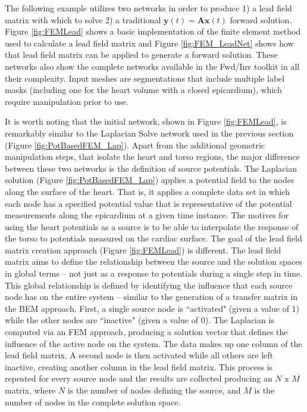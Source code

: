 The following example utilizes two networks in order to produce 1) a lead field matrix with which to solve 
2) a traditional $\mathbf{y}(t) = \mathbf{A}\mathbf{x}(t)$ forward solution. 
Figure \ref{fig:FEMLead} shows a basic implementation of the finite element method used to calculate a lead field matrix and Figure \ref{fig:FEM_LeadNet} shows how that lead field matrix can be applied to generate a forward solution. 
These networks also show the complete networks available in the Fwd/Inv toolkit in all their complexity.  
Input meshes are segmentations that include multiple label masks (including one for the heart volume with a closed epicardium), which require manipulation prior to use. 

It is worth noting that the initial network, shown in Figure \ref{fig:FEMLead}, is remarkably similar to the Laplacian Solve network used in the previous section (Figure \ref{fig:PotBasedFEM_Lap}). 
Apart from the additional geometric manipulation steps, that isolate the heart and torso regions, the major difference between these two networks is the definition of source potentials. 
The Laplacian solution (Figure \ref{fig:PotBasedFEM_Lap}) applies a potential field to the nodes along the surface of the heart.  
That is, it applies a complete data set in which each node has a specified potential value that is representative of the potential measurements along the epicardium at a given time instance. 
The motives for using the heart potentials as a source is to be able to interpolate the response of the torso to potentials measured on the cardiac surface. 
The goal of the lead field matrix creation approach (Figure \ref{fig:FEMLead}) is different. 
The lead field matrix aims to define the relationship between the source and the solution spaces in global terms -- not just as a response to potentials during a single step in time. 
This global relationship is defined by identifying the influence that each source node has on the entire system -- similar to the generation of a transfer matrix in the BEM approach. 
First, a single source node is ``activated" (given a value of 1) while the other nodes are ``inactive" (given a value of 0). 
The Laplacian is computed via an FEM approach, producing a solution vector that defines the influence of the active node on the system. 
The data makes up one column of the lead field matrix. 
A second node is then activated while all others are left inactive, creating another column in the lead field matrix. 
This process is repeated for every source node and the results are collected producing an $N$ x $M$ matrix, where $N$ is the number of nodes defining the source, and $M$ is the number of nodes in the complete solution space. 

